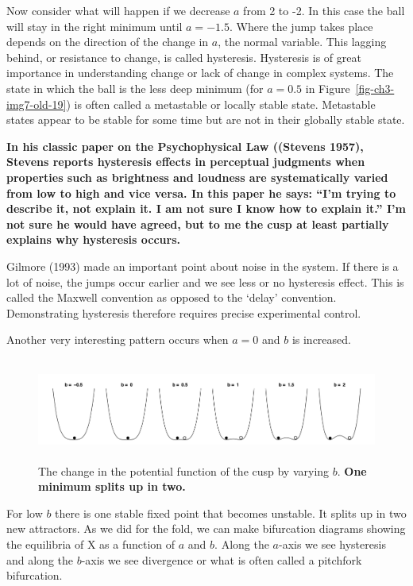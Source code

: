 \documentclass[
  letterpaper,
]{scrbook}
\begin{document}
Now consider what will happen if we decrease \(a\) from 2 to -2. In this
case the ball will stay in the right minimum until \(a = - 1.5\). Where
the jump takes place depends on the direction of the change in \(a\),
the normal variable. This lagging behind, or resistance to change, is
called hysteresis. Hysteresis is of great importance in understanding
change or lack of change in complex systems. The state in which the ball
is the less deep minimum (for \(a = 0.5\) in
Figure~\ref{fig-ch3-img7-old-19}) is often called a metastable or
locally stable state. Metastable states appear to be stable for some
time but are not in their globally stable state.

\textbf{In his classic paper on the Psychophysical Law ((Stevens 1957),
Stevens reports hysteresis effects in perceptual judgments when
properties such as brightness and loudness are systematically varied
from low to high and vice versa. In this paper he says: ``I'm trying to
describe it, not explain it. I am not sure I know how to explain it.''
I'm not sure he would have agreed, but to me the cusp at least partially
explains why hysteresis occurs.}

Gilmore (1993) made an important point about noise in the system. If
there is a lot of noise, the jumps occur earlier and we see less or no
hysteresis effect. This is called the Maxwell convention as opposed to
the `delay' convention. Demonstrating hysteresis therefore requires
precise experimental control.

Another very interesting pattern occurs when \(a = 0\) and \(b\) is
increased.

\begin{figure}

{\centering \includegraphics[width=6.26389in,height=1.32431in]{media/ch3/image8.jpg}

}

\caption{\label{fig-ch3-img8-old-20}The change in the potential function
of the cusp by varying \(b\). \textbf{One minimum splits up in two.}}

\end{figure}

For low \(b\) there is one stable fixed point that becomes unstable. It
splits up in two new attractors. As we did for the fold, we can make
bifurcation diagrams showing the equilibria of X as a function of \(a\)
and \(b\). Along the \(a\)-axis we see hysteresis and along the
\(b\)-axis we see divergence or what is often called a pitchfork
bifurcation.
\end{document}
